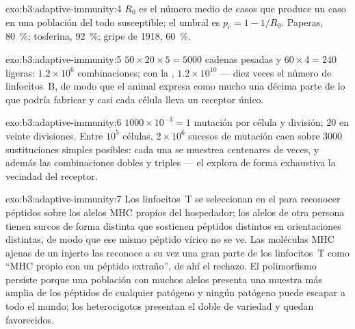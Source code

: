 \begin{solution}{exo:b3:adaptive-immunity:4}
$R_{0}$ es el número medio de casos que produce un caso en una población
del todo susceptible; el umbral es $p_{c} = 1 - 1/R_{0}$. Paperas,
\qty{80}{\%}; tosferina, \qty{92}{\%}; gripe de 1918, \qty{60}{\%}.
\end{solution}

\begin{solution}{exo:b3:adaptive-immunity:5}
$50\times 20\times 5 = 5000$ cadenas pesadas y $60\times 4 = 240$
ligeras: $1.2\times 10^{6}$ combinaciones; con la ,
$1.2\times
10^{10}$ --- diez veces el número de linfocitos~B, de modo que el animal
expresa como mucho una décima parte de lo que podría fabricar y casi cada
célula lleva un receptor único.
\end{solution}

\begin{solution}{exo:b3:adaptive-immunity:6}
$1000\times 10^{-3} = 1$ mutación por célula y división; $20$ en veinte
divisiones. Entre $10^{5}$ células, $2\times 10^{6}$ sucesos de mutación
caen sobre $3000$ sustituciones simples posibles: cada una se muestrea
centenares de veces, y además las combinaciones dobles y triples --- el
 explora de forma exhaustiva la vecindad del receptor.
\end{solution}

\begin{solution}{exo:b3:adaptive-immunity:7}
Los linfocitos~T se seleccionan en el  para reconocer péptidos sobre
los alelos MHC propios del hospedador; los alelos de otra persona tienen
surcos de forma distinta que sostienen péptidos distintos en
orientaciones distintas, de modo que ese mismo péptido vírico no se ve.
Las moléculas MHC ajenas de un injerto las reconoce a su vez una gran
parte de los linfocitos~T como ``MHC propio con un péptido extraño'', de
ahí el rechazo. El polimorfismo persiste porque una población con muchos
alelos presenta una muestra más amplia de los péptidos de cualquier
patógeno y ningún patógeno puede escapar a todo el mundo; los
heterocigotos presentan el doble de variedad y quedan favorecidos.
\end{solution}

